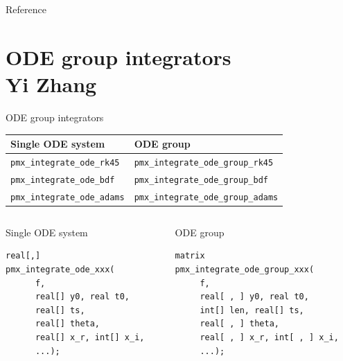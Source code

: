 \documentclass[presentation]{beamer}
\begin{document}
\begin{frame}[label={sec:orgd272590}]{Reference}


\end{frame}

\section{ODE group integrators \\ \footnotesize{Yi Zhang}}
\label{sec:orga59eb6d}

\begin{frame}[fragile,label={sec:org360f2ad}]{ODE group integrators}
 \begin{center}
\begin{tabular}{ll}
Single ODE system & ODE group\\
\hline
\texttt{pmx\_integrate\_ode\_rk45} & \texttt{pmx\_integrate\_ode\_group\_rk45}\\
\texttt{pmx\_integrate\_ode\_bdf} & \texttt{pmx\_integrate\_ode\_group\_bdf}\\
\texttt{pmx\_integrate\_ode\_adams} & \texttt{pmx\_integrate\_ode\_group\_adams}\\
\end{tabular}

\end{center}

\begin{columns}
\begin{column}{0.45\columnwidth}
\begin{block}{Single ODE system}
\begin{verbatim}
real[,]
pmx_integrate_ode_xxx(
      f,
      real[] y0, real t0,
      real[] ts,
      real[] theta,
      real[] x_r, int[] x_i,
      ...);
\end{verbatim}
\end{block}
\end{column}

\begin{column}{0.55\columnwidth}
\begin{block}{ODE group}
\begin{verbatim}
matrix
pmx_integrate_ode_group_xxx(
     f,
     real[ , ] y0, real t0,
     int[] len, real[] ts,
     real[ , ] theta,
     real[ , ] x_r, int[ , ] x_i,
     ...);
\end{verbatim}
\end{block}
\end{column}
\end{columns}
\end{frame}
\end{document}
